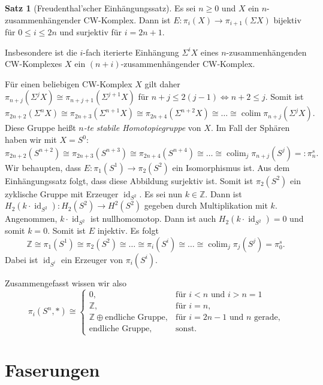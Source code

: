\documentclass[11pt, a4paper, german]{article}
\theoremstyle{definition}
\newtheorem{satz}{Satz}
\theoremstyle{remark}
\newcommand{\Z}{\mathbb{Z}} %
\DeclareMathOperator{\id}{id} %
\DeclareMathOperator{\colim}{colim} %
\begin{document}
\begin{satz}[Freudenthal'scher Einhängungssatz]
  Es sei $n \geq 0$ und $X$ ein $n$-zusammenhängender CW-Komplex.
  Dann ist $E : \pi_i(X) \to \pi_{i+1}(\Sigma X)$ bijektiv für $0 \leq i \leq 2n$ und surjektiv für $i = 2n + 1$.
\end{satz}

Insbesondere ist die $i$-fach iterierte Einhängung $\Sigma^i X$ eines $n$-zusammenhängenden CW-Komplexes $X$ ein $(n{+}i)$-zusammenhängender CW-Komplex.

Für einen beliebigen CW-Komplex $X$ gilt daher $\pi_{n+j}(\Sigma^j X) \cong \pi_{n+j+1}(\Sigma^{j+1} X)$ für $n + j \leq 2(j-1) \Leftrightarrow n+2 \leq j$.
Somit ist
\[ \pi_{2n+2}(\Sigma^{n} X) \cong \pi_{2n+3}(\Sigma^{n+1} X) \cong \pi_{2n+4}(\Sigma^{n+2} X) \cong \ldots \cong \colim \pi_{n+j}(\Sigma^j X). \]
Diese Gruppe heißt \emph{$n$-te stabile Homotopiegruppe} von $X$.
Im Fall der Sphären haben wir mit $X = S^0$:
\[ \pi_{2n+2}(S^{n+2}) \cong \pi_{2n+3}(S^{n+3}) \cong \pi_{2n+4}(S^{n+4}) \cong \ldots \cong \colim_j \pi_{n+j}(S^j) =: \pi^s_n. \]
Wir behaupten, dass $E : \pi_1(S^1) \to \pi_2(S^2)$ ein Isomorphismus ist.
Aus dem Einhängungssatz folgt, dass diese Abbildung surjektiv ist.
Somit ist $\pi_2(S^2)$ ein zyklische Gruppe mit Erzeuger $\id_{S^2}$.
Es sei nun $k \in \Z$.
Dann ist $H_2(k \cdot \id_{S^2}) : H_2(S^2) \to H^2(S^2)$ gegeben durch Multiplikation mit $k$.
Angenommen, $k \cdot \id_{S^2}$ ist nullhomomotop.
Dann ist auch $H_2(k \cdot \id_{S^2}) = 0$ und somit $k = 0$.
Somit ist $E$ injektiv.
Es folgt
\[ \Z \cong \pi_1(S^1) \cong \pi_2(S^2) \cong \ldots \cong \pi_i(S^i)  \cong \ldots \cong \colim_j \pi_j(S^j) = \pi^s_0. \]
Dabei ist $\id_{S^i}$ ein Erzeuger von $\pi_i(S^i)$.

Zusammengefasst wissen wir also
\[
  \pi_i(S^n, *) \cong \begin{cases}
    0, & \text{für $i < n$ und $i > n = 1$} \\
    \Z, & \text{für $i = n$,} \\
    \Z \oplus \text{endliche Gruppe}, & \text{für $i=2n-1$ und $n$ gerade,} \\
    \text{endliche Gruppe}, & \text{sonst.}
  \end{cases}
\]

\section{Faserungen}
\end{document}
